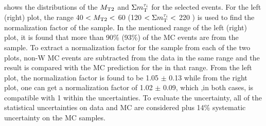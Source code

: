shows the distributions of the ${M_{\rm T2}}$ and $\Sigma m_{\rm T}^{\tau_i}$ for the selected events. For the left (right) plot, the range 40 $<{M_{\rm T2}}<$ 60 \GeV (120 $<\Sigma m_{\rm T}^{\tau_i}<$ 220 \GeV) is used to find the normalization factor of the \wjets sample. In the mentioned range of the left (right) plot, it is found that more than 90\% (93\%) of the MC events are from the \wjets sample. 
To extract a normalization factor for the \wjets sample from each of the two plots, non-W MC events are subtracted from the data in the same range 
and the result is compared with the MC prediction for the \wjets in that range. From the left plot, the normalization factor is 
found to be 1.05 $\pm$ 0.13 while from the right plot, one can get a normalization factor of 1.02 $\pm$ 0.09, which ,in both cases, 
is compatible with 1 within the uncertainties. To evaluate the uncertainty, 
all of the statistical uncertainties on data and MC are considered plus 14\% systematic uncertainty on the MC samples.

